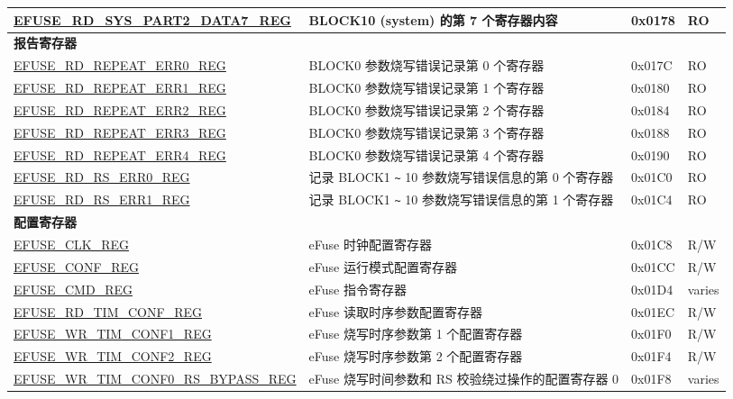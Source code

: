 \begin{longtable}{ | p{5.8cm} | p{7cm} | p{1.3cm} | p{1.2cm} | }
\hyperref[regdesc:EFUSERDSYSPART2DATA7REG]{EFUSE\_RD\_SYS\_PART2\_DATA7\_REG} & BLOCK10 (system) 的第 7 个寄存器内容 & 0x0178 & RO \\ \hline
\multicolumn{4}{|l|}{\textbf{报告寄存器}} \\ \hline
\hyperref[regdesc:EFUSERDREPEATERR0REG]{EFUSE\_RD\_REPEAT\_ERR0\_REG} & BLOCK0 参数烧写错误记录第 0 个寄存器 & 0x017C & RO \\ \hline
\hyperref[regdesc:EFUSERDREPEATERR1REG]{EFUSE\_RD\_REPEAT\_ERR1\_REG} & BLOCK0 参数烧写错误记录第 1 个寄存器 & 0x0180 & RO \\ \hline
\hyperref[regdesc:EFUSERDREPEATERR2REG]{EFUSE\_RD\_REPEAT\_ERR2\_REG} & BLOCK0 参数烧写错误记录第 2 个寄存器 & 0x0184 & RO \\ \hline
\hyperref[regdesc:EFUSERDREPEATERR3REG]{EFUSE\_RD\_REPEAT\_ERR3\_REG} & BLOCK0 参数烧写错误记录第 3 个寄存器 & 0x0188 & RO \\ \hline
\hyperref[regdesc:EFUSERDREPEATERR4REG]{EFUSE\_RD\_REPEAT\_ERR4\_REG} & BLOCK0 参数烧写错误记录第 4 个寄存器 & 0x0190 & RO \\ \hline
\hyperref[regdesc:EFUSERDRSERR0REG]{EFUSE\_RD\_RS\_ERR0\_REG} & 记录 BLOCK1 \verb+~+ 10 参数烧写错误信息的第 0 个寄存器 & 0x01C0 & RO \\ \hline
\hyperref[regdesc:EFUSERDRSERR1REG]{EFUSE\_RD\_RS\_ERR1\_REG} & 记录 BLOCK1 \verb+~+ 10 参数烧写错误信息的第 1 个寄存器 & 0x01C4 & RO \\ \hline
\multicolumn{4}{|l|}{\textbf{配置寄存器}} \\ \hline
\hyperref[regdesc:EFUSECLKREG]{EFUSE\_CLK\_REG} & eFuse 时钟配置寄存器 & 0x01C8 & R/W \\ \hline
\hyperref[regdesc:EFUSECONFREG]{EFUSE\_CONF\_REG} & eFuse 运行模式配置寄存器 & 0x01CC & R/W \\ \hline
\hyperref[regdesc:EFUSECMDREG]{EFUSE\_CMD\_REG} & eFuse 指令寄存器 & 0x01D4 & varies \\ \hline
\hyperref[regdesc:EFUSERDTIMCONFREG]{EFUSE\_RD\_TIM\_CONF\_REG} & eFuse 读取时序参数配置寄存器 & 0x01EC & R/W \\ \hline
\hyperref[regdesc:EFUSEWRTIMCONF1REG]{EFUSE\_WR\_TIM\_CONF1\_REG} & eFuse 烧写时序参数第 1 个配置寄存器 & 0x01F0 & R/W \\ \hline
\hyperref[regdesc:EFUSEWRTIMCONF2REG]{EFUSE\_WR\_TIM\_CONF2\_REG} & eFuse 烧写时序参数第 2 个配置寄存器 & 0x01F4 & R/W \\ \hline
\hyperref[regdesc:EFUSEWRTIMCONF0RSBYPASSREG]{EFUSE\_\-WR\_\-TIM\_\-CONF0\_\-RS\_\-BYPASS\_\-REG} & eFuse 烧写时间参数和 RS 校验绕过操作的配置寄存器 0 & 0x01F8 & varies \\ \hline

\end{longtable}
